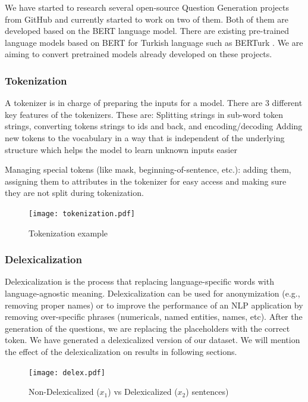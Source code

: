 \documentclass{mefsdp}
\begin{document}
	We have started to research several open-source Question Generation projects from GitHub and currently started to work on two of them. Both of them are developed based on the BERT language model. There are existing pre-trained language models based on BERT for Turkish language such as BERTurk \cite{stefan_schweter_2020_3770924}. We are aiming to convert pretrained models already developed on these projects.
	
	\subsubsection{Tokenization}
	A tokenizer is in charge of preparing the inputs for a model. There are 3 different key features of the tokenizers. These are:
	Splitting strings in sub-word token strings, converting tokens strings to ids and back, and encoding/decoding
	Adding new tokens to the vocabulary in a way that is independent of the underlying structure which helps the model to learn unknown inputs easier
	
	Managing special tokens (like mask, beginning-of-sentence, etc.): adding them, assigning them to attributes in the tokenizer for easy access and making sure they are not split during tokenization.
	
	\begin{figure}[h!]
		\centering
		\texttt{[image: tokenization.pdf]}
		\caption{Tokenization example\label{token}}
	\end{figure}
	
	\subsubsection{Delexicalization}
	Delexicalization is the process that replacing language-specific words with language-agnostic meaning. Delexicalization can be used for anonymization (e.g., removing proper names) or to improve the performance of an NLP application by removing over-specific phrases (numericals, named entities, names, etc). After the generation of the questions, we are replacing the placeholders with the correct token. We have generated a delexicalized version of our dataset. We will mention the effect of the delexicalization on results in following sections.
	
	\begin{figure}[h!]
		\centering
		\texttt{[image: delex.pdf]}
		\caption{Non-Delexicalized ($x_1$) vs Delexicalized ($x_2$) sentences)\label{delex}}
	\end{figure}
\end{document}
